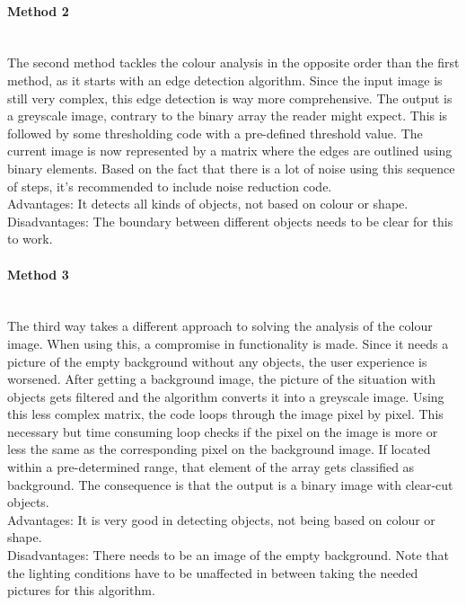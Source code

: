 \documentclass[11pt]{article}
\begin{document}
\paragraph{Method 2}\mbox{}\\
The second method tackles the colour analysis in the opposite order than the first method, as it starts with an edge detection algorithm. Since the input image is still very complex, this edge detection is way more comprehensive. The output is a greyscale image, contrary to the binary array the reader might expect. This is followed by some thresholding code with a pre-defined threshold value. The current image is now represented by a matrix where the edges are outlined using binary elements. Based on the fact that there is a lot of noise using this sequence of steps, it's recommended to include noise reduction code.
\\Advantages: It detects all kinds of objects, not based on colour or shape.
\\Disadvantages: The boundary between different objects needs to be clear for this to work.
\paragraph{Method 3}\mbox{}\\
The third way takes a different approach to solving the analysis of the colour image. When using this, a compromise in functionality is made. Since it needs a picture of the empty background without any objects, the user experience is worsened. After getting a background image, the picture of the situation with objects gets filtered and the algorithm converts it into a greyscale image. Using this less complex matrix, the code loops through the image pixel by pixel. This necessary but time consuming loop checks if the pixel on the image is more or less the same as the corresponding pixel on the background image. If located within a pre-determined range, that element of the array gets classified as background. The consequence is that the output is a binary image with clear-cut objects.
\\Advantages: It is very good in detecting objects, not being based on colour or shape.
\\Disadvantages: There needs to be an image of the empty background. Note that the lighting conditions have to be unaffected in between taking the needed pictures for this algorithm.
\end{document}

